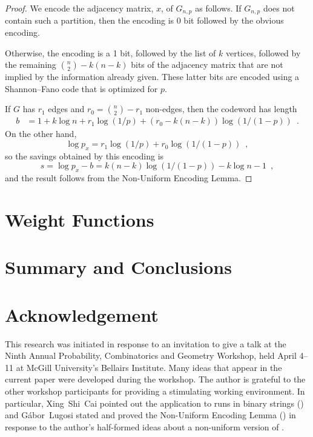 \documentclass{patmorin}
\begin{document}
\begin{proof}
  We encode the adjacency matrix, $x$, of $G_{n,p}$ as follows.
  If $G_{n,p}$ does not contain such a partition, then the encoding is
  0 bit followed by the obvious encoding.

  Otherwise, the encoding is a 1 bit, followed by the list of $k$
  vertices, followed by the remaining $\binom{n}{2}-k(n-k)$ bits of the
  adjacency matrix that are not implied by the information already given.
  These latter bits are encoded using a Shannon--Fano code that is
  optimized for $p$.

  If $G$ has $r_1$ edges and $r_0=\binom{n}{2}-r_1$ non-edges, then the codeword has length
  \begin{align*}
      b & = 1 + k\log n + r_1\log(1/p) + (r_0-k(n-k))\log(1/(1-p)) \enspace .
  \end{align*}
  On the other hand,
  \[
      \log p_x = r_1\log(1/p) + r_0\log(1/(1-p)) \enspace ,
  \]
  so the savings obtained by this encoding is 
  \[
      s = \log p_x - b = k(n-k)\log(1/(1-p)) - k\log n - 1 \enspace ,
  \]
  and the result follows from the Non-Uniform Encoding Lemma.
\end{proof}




\subsection{}


\section{Weight Functions}

\section{Summary and Conclusions}


\section*{Acknowledgement}

This research was initiated in response to an invitation to give
a talk at the Ninth Annual Probability, Combinatorics and Geometry
Workshop, held April 4--11 at McGill University's Bellairs Institute.
Many ideas that appear in the current paper were developed during the
workshop. The author is grateful to the other workshop participants for
providing a stimulating working environment.  In particular, Xing~Shi~Cai
pointed out the application to runs in binary strings ()
and G\'abor~Lugosi stated and proved the Non-Uniform Encoding Lemma
() in response to the author's half-formed ideas about a
non-uniform version of .

{}

\end{document}
